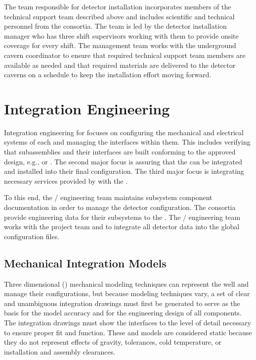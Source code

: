 The team responsible for detector installation incorporates 
members of the technical support team described above 
and includes scientific and technical personnel from 
the  consortia.  The team is led by the detector
installation manager who has three shift supervisors working 
with them to provide onsite coverage for every shift.
The management team works with the underground cavern
coordinator to ensure that required technical support team 
members are available as needed and that required materials 
are delivered to the detector caverns on a schedule to keep
the installation effort moving forward.   

\section{Integration Engineering}
\label{sec:es-coord-integ-sysengr}

Integration engineering for  focuses on configuring the
mechanical and electrical systems of each  and managing
the interfaces within them. This includes verifying that subassemblies
and their interfaces are built conforming to the approved design,
e.g.,  or . The second major focus
is assuring that the  can be integrated and
installed into their final configuration. The third major focus is
integrating necessary services provided by  
with the .

To this end, the / engineering team maintains
subsystem component documentation in order to manage the detector
configuration. The consortia provide engineering data for their
subsystems to the . The / engineering team
works with the  project team and  to integrate
all detector data into the global  configuration files.

\subsection{Mechanical Integration Models}
\label{sec:es-tc-mech}

Three dimensional (\threed) mechanical modeling techniques can represent the  well and manage their configurations, but because  \threed modeling techniques vary, a set
of clear and unambiguous \twod integration drawings must first be generated to serve as
the basis for the \threed model accuracy and for the engineering
design of all components. The \twod integration drawings must show the 
interfaces to the level of detail necessary to ensure proper fit and function.  These \threed and 
\twod models are considered static because they do not represent effects of gravity, tolerances, cold
temperature, or installation and assembly clearances.

